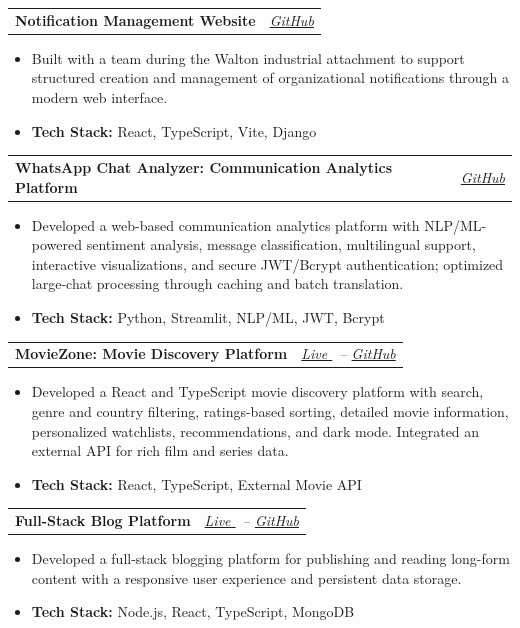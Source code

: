 \documentclass[11pt,a4paper]{article}
\makeatletter
\newcommand{\entryheading}[2]{%
  \begin{tabularx}{\textwidth}{@{}>{\raggedright\arraybackslash}X>{\raggedleft\arraybackslash}p{1.55in}@{}}
    \textbf{#1} & \textit{#2}
  \end{tabularx}\vspace{1pt}%
}
\newcommand{\tech}[1]{\textbf{Tech Stack:} #1}
\newcommand{\spacer}{\vspace{6pt}}
\newcommand{\projectheading}[2]{\needspace{6\baselineskip}\entryheading{#1}{#2}}
\makeatother
\begin{document}
\projectheading{Notification Management Website}{\href{https://github.com/ahmikat/notification_project}{GitHub \faExternalLink*}}
\begin{itemize}
  \item Built with a team during the Walton industrial attachment to support structured creation
        and management of organizational notifications through a modern web interface.
  \item \tech{React, TypeScript, Vite, Django}
\end{itemize}
\spacer

\projectheading{WhatsApp Chat Analyzer: Communication Analytics Platform}{\href{https://github.com/ahmikat/WhatsApp-Chat-Analysis}{GitHub \faExternalLink*}}
\begin{itemize}
  \item Developed a web-based communication analytics platform with NLP/ML-powered sentiment
        analysis, message classification, multilingual support, interactive visualizations, and
        secure JWT/Bcrypt authentication; optimized large-chat processing through caching and
        batch translation.
  \item \tech{Python, Streamlit, NLP/ML, JWT, Bcrypt}
\end{itemize}
\spacer

\projectheading{MovieZone: Movie Discovery Platform}{\href{https://movie-explorer-silk-one.vercel.app/}{Live \faExternalLink*}\ -- \href{https://github.com/ahmikat/movie-explorer}{GitHub \faExternalLink*}}
\begin{itemize}
  \item Developed a React and TypeScript movie discovery platform with search, genre and country
        filtering, ratings-based sorting, detailed movie information, personalized watchlists,
        recommendations, and dark mode. Integrated an external API for rich film and series data.
  \item \tech{React, TypeScript, External Movie API}
\end{itemize}
\spacer

\projectheading{Full-Stack Blog Platform}{\href{https://blog-three-kappa-10.vercel.app/}{Live \faExternalLink*}\ -- \href{https://github.com/ahmikat/FullStack-Blog}{GitHub \faExternalLink*}}
\begin{itemize}
  \item Developed a full-stack blogging platform for publishing and reading long-form content with
        a responsive user experience and persistent data storage.
  \item \tech{Node.js, React, TypeScript, MongoDB}
\end{itemize}
\end{document}
